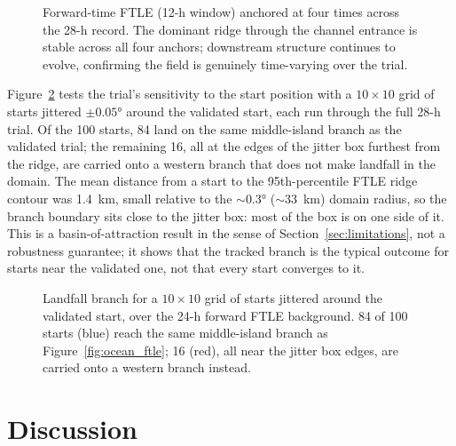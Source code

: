 \documentclass[12pt, letterpaper, oneside]{report}
\begin{document}
\begin{figure}[!t]
    \centering
    \framebox[0.9\linewidth]{\rule{0pt}{3.0cm}}
    \caption{Forward-time FTLE (12-h window) anchored at four times
    across the 28-h record. The dominant ridge through the channel
    entrance is stable across all four anchors; downstream structure
    continues to evolve, confirming the field is genuinely time-varying
    over the trial.}
    \label{fig:ocean_ftle_snapshots}
\end{figure}

Figure~\ref{fig:ocean_branch} tests the trial's sensitivity to the start
position with a $10 \times 10$ grid of starts jittered
$\pm 0.05°$ around the validated start, each run through the
full 28-h trial. Of the 100 starts, 84 land on the same
middle-island branch as the validated trial; the remaining 16, all at
the edges of the jitter box furthest from the ridge, are carried onto a
western branch that does not make landfall in the domain. The mean
distance from a start to the 95th-percentile FTLE ridge contour was
1.4~km, small relative to the $\sim 0.3°$ ($\sim 33$~km) domain
radius, so the branch boundary sits close to the jitter box: most of
the box is on one side of it. This is a basin-of-attraction result in
the sense of Section~\ref{sec:limitations}, not a robustness guarantee;
it shows that the tracked branch is the typical outcome for starts near
the validated one, not that every start converges to it.

\begin{figure}[!t]
    \centering
    \framebox[0.9\linewidth]{\rule{0pt}{3.0cm}}
    \caption{Landfall branch for a $10 \times 10$ grid of starts jittered
    around the validated start, over the 24-h forward FTLE background.
    84 of 100 starts (blue) reach the same middle-island branch as
    Figure~\ref{fig:ocean_ftle}; 16 (red), all near the jitter box edges,
    are carried onto a western branch instead.}
    \label{fig:ocean_branch}
\end{figure}

\section{Discussion}
\label{sec:discussion}
\end{document}
